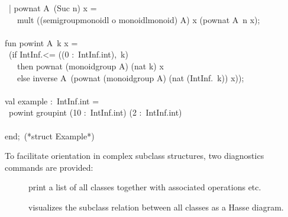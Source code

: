 \begin{isabellebody}
\begin{isamarkuptext}
\hspace*{0pt} ~| pow{}nat A{}~(Suc n) x =\\
\hspace*{0pt} ~~~mult ((semigroup{}monoidl o monoidl{}monoid) A{}) x (pow{}nat A{}~n x);\\
\hspace*{0pt}\\
\hspace*{0pt}fun pow{}int A{}~k x =\\
\hspace*{0pt} ~(if IntInf.<= ((0 :~IntInf.int),~k)\\
\hspace*{0pt} ~~~then pow{}nat (monoid{}group A{}) (nat k) x\\
\hspace*{0pt} ~~~else inverse A{}~(pow{}nat (monoid{}group A{}) (nat (IntInf.{}~k)) x));\\
\hspace*{0pt}\\
\hspace*{0pt}val example :~IntInf.int =\\
\hspace*{0pt} ~pow{}int group{}int (10 :~IntInf.int) ({}2 :~IntInf.int)\\
\hspace*{0pt}\\
\hspace*{0pt}end;~(*struct Example*)%
\end{isamarkuptext}%
\isamarkuptrue%
%
\endisatagquote
{\isafoldquote}%
%
\isadelimquote
%
\endisadelimquote
%
\isamarkuptrue%
%
\begin{isamarkuptext}%
To facilitate orientation in complex subclass structures,
  two diagnostics commands are provided:

  \begin{description}

    \item[\hyperlink{command.print-classes}{\mbox{}}] print a list of all classes
      together with associated operations etc.

    \item[\hyperlink{command.class-deps}{\mbox{}}] visualizes the subclass relation
      between all classes as a Hasse diagram.

  \end{description}%
\end{isamarkuptext}%
\isamarkuptrue%
%
\isadelimtheory
%
\endisadelimtheory
%
\isatagtheory
{}\isamarkupfalse%
%
\endisatagtheory
{\isafoldtheory}%
%
\isadelimtheory
%
\endisadelimtheory
\isanewline
\end{isabellebody}%
